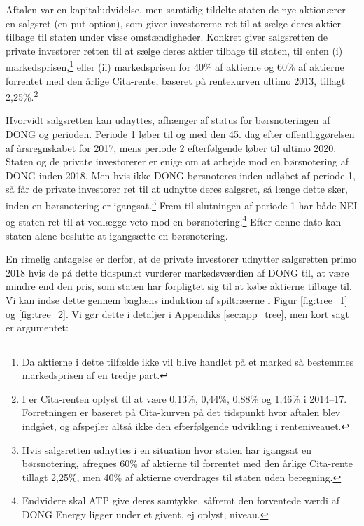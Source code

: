 \documentclass{article}
\begin{document}
Aftalen var en kapitaludvidelse, men samtidig tildelte staten de nye aktionærer en salgsret (en put-option), som giver investorerne ret til at sælge deres aktier tilbage til staten under visse omstændigheder. Konkret giver salgsretten de private investorer retten til at sælge deres aktier tilbage til staten,  til enten (i) markedsprisen,\footnote{Da aktierne i dette tilfælde ikke vil blive handlet på et marked så bestemmes markedsprisen af en tredje part.} eller (ii) markedsprisen for 40\% af aktierne og 60\% af aktierne forrentet med den årlige Cita-rente, baseret på rentekurven ultimo 2013, tillagt 2,25\%.\footnote{I \citet{FM2013f} er Cita-renten oplyst til at være 0,13\%, 0,44\%, 0,88\% og 1,46\% i 2014--17. Forretningen er baseret på Cita-kurven på det tidspunkt hvor aftalen blev indgået, og afspejler altså ikke den efterfølgende udvikling i renteniveauet.}

Hvorvidt salgsretten kan udnyttes, afhænger af status for børsnoteringen af DONG og perioden. Periode 1 løber til og med den 45. dag efter offentliggørelsen af årsregnskabet for 2017, mens periode 2 efterfølgende løber til ultimo 2020. Staten og de private investorerer er enige om at arbejde mod en børsnotering af DONG inden 2018. Men hvis ikke DONG børsnoteres inden udløbet af periode 1, så får de private investorer ret til at udnytte deres salgsret, så længe dette sker, inden en børsnotering er igangsat.\footnote{Hvis salgsretten udnyttes i en situation hvor staten har igangsat en børsnotering, afregnes 60\% af aktierne til  forrentet med den årlige Cita-rente tillagt 2,25\%, men 40\% af aktierne overdrages til staten uden beregning.} Frem til slutningen af periode 1 har både NEI og staten ret til at vedlægge veto mod en børsnotering.\footnote{Endvidere skal ATP give deres samtykke, såfremt den forventede værdi af DONG Energy ligger under et givent, ej oplyst, niveau.} Efter denne dato kan staten alene beslutte at igangsætte en børsnotering.

En rimelig antagelse er derfor, at de private investorer udnytter salgsretten primo 2018 hvis de på dette tidspunkt vurderer markedsværdien af DONG til, at være mindre end den pris, som staten har forpligtet sig til at købe aktierne tilbage til. Vi kan indse dette gennem baglæns induktion af spiltræerne i Figur \ref{fig:tree_1} og \ref{fig:tree_2}. Vi gør dette i detaljer i Appendiks \ref{sec:app_tree}, men kort sagt er argumentet:
\end{document}

